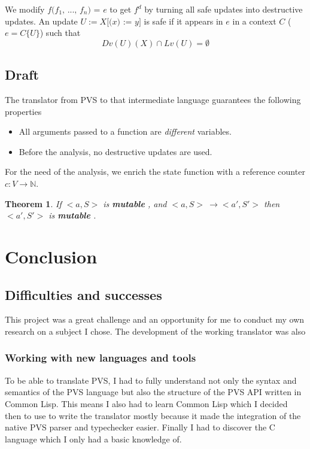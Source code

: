 \documentclass[12pt,a4paper]{article}
\newcommand{\cl}[1]{\texttt{#1}}
\newtheorem{theorem}{Theorem}
\newcommand{\N}{\mathbb{N}}
\newcommand{\mut}{  \textbf{ mutable } }
\newcommand{\ucont}[1]{\{#1\}}
\begin{document}
We modify $f\cl{(}f_1\cl{, } ... \cl{, } f_n\cl{) = } e$ to get $f^d$ by turning all safe updates into destructive updates.
An update $U := X\cl{[(}x\cl{) := }y\cl{]}$ is safe if it appears in $e$ in a context $C$ ($e = C\ucont{U}$) such that
$$ Dv(U)(X) \cap Lv(U) = \emptyset $$




\newpage
\subsection{Draft}

The translator from PVS to that intermediate language guarantees the following properties 
\begin{itemize}
\item All arguments passed to a function are \emph{different} variables.
\item Before the analysis, no destructive updates are used.
\end{itemize} 

For the need of the analysis, we enrich the state function with a reference counter $c:V \rightarrow \N$.


\begin{theorem}
If $<a, S>$ is \mut, and $<a, S> \ \longrightarrow <a', S'>$ then $<a', S'>$ is \mut.
\end{theorem}










\newpage
\section{Conclusion}


\subsection{Difficulties and successes}

This project was a great challenge and an opportunity for me to conduct my own research on a subject I chose. The development of the working translator was also 


\subsubsection{Working with new languages and tools}

To be able to translate PVS, I had to fully understand not only the syntax and semantics of the PVS language but also the structure of the PVS API written in Common Lisp. This means I also had to learn Common Lisp which I decided then to use to write the translator mostly because it made the integration of the native PVS parser and typechecker easier. Finally I had to discover the C language which I only had a basic knowledge of.
\end{document}
